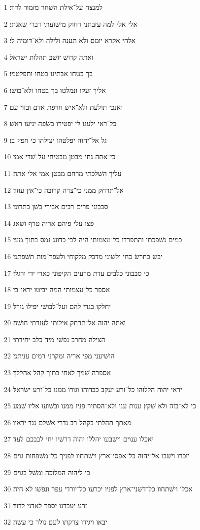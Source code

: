 \par 1 למנצח על־אילת השׁחר מזמור לדוד׃
\par 2 אלי אלי למה עזבתני רחוק מישׁועתי דברי שׁאגתי׃
\par 3 אלהי אקרא יומם ולא תענה ולילה ולא־דומיה לי׃
\par 4 ואתה קדושׁ יושׁב תהלות ישׂראל׃
\par 5 בך בטחו אבתינו בטחו ותפלטמו׃
\par 6 אליך זעקו ונמלטו בך בטחו ולא־בושׁו׃
\par 7 ואנכי תולעת ולא־אישׁ חרפת אדם ובזוי עם׃
\par 8 כל־ראי ילעגו לי יפטירו בשׂפה יניעו ראשׁ׃
\par 9 גל אל־יהוה יפלטהו יצילהו כי חפץ בו׃
\par 10 כי־אתה גחי מבטן מבטיחי על־שׁדי אמי׃
\par 11 עליך השׁלכתי מרחם מבטן אמי אלי אתה׃
\par 12 אל־תרחק ממני כי־צרה קרובה כי־אין עוזר׃
\par 13 סבבוני פרים רבים אבירי בשׁן כתרוני׃
\par 14 פצו עלי פיהם אריה טרף ושׁאג׃
\par 15 כמים נשׁפכתי והתפרדו כל־עצמותי היה לבי כדונג נמס בתוך מעי׃
\par 16 יבשׁ כחרשׂ כחי ולשׁוני מדבק מלקוחי ולעפר־מות תשׁפתני׃
\par 17 כי סבבוני כלבים עדת מרעים הקיפוני כארי ידי ורגלי׃
\par 18 אספר כל־עצמותי המה יביטו יראו־בי׃
\par 19 יחלקו בגדי להם ועל־לבושׁי יפילו גורל׃
\par 20 ואתה יהוה אל־תרחק אילותי לעזרתי חושׁה׃
\par 21 הצילה מחרב נפשׁי מיד־כלב יחידתי׃
\par 22 הושׁיעני מפי אריה ומקרני רמים עניתני׃
\par 23 אספרה שׁמך לאחי בתוך קהל אהללך׃
\par 24 יראי יהוה הללוהו כל־זרע יעקב כבדוהו וגורו ממנו כל־זרע ישׂראל׃
\par 25 כי לא־בזה ולא שׁקץ ענות עני ולא־הסתיר פניו ממנו ובשׁועו אליו שׁמע׃
\par 26 מאתך תהלתי בקהל רב נדרי אשׁלם נגד יראיו׃
\par 27 יאכלו ענוים וישׂבעו יהללו יהוה דרשׁיו יחי לבבכם לעד׃
\par 28 יזכרו וישׁבו אל־יהוה כל־אפסי־ארץ וישׁתחוו לפניך כל־משׁפחות גוים׃
\par 29 כי ליהוה המלוכה ומשׁל בגוים׃
\par 30 אכלו וישׁתחוו כל־דשׁני־ארץ לפניו יכרעו כל־יורדי עפר ונפשׁו לא חיה׃
\par 31 זרע יעבדנו יספר לאדני לדור׃
\par 32 יבאו ויגידו צדקתו לעם נולד כי עשׂה׃

